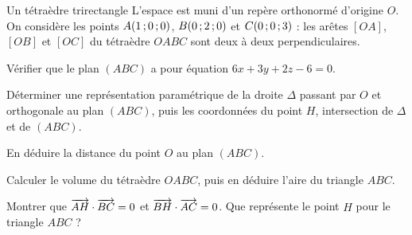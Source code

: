 \begin{exercice}[3]{Un tétraèdre trirectangle}
L'espace est muni d'un repère orthonormé d'origine $O$. On considère les points $A(1\,{;}\,0\,{;}\,0)$, $B(0\,{;}\,2\,{;}\,0)$ et $C(0\,{;}\,0\,{;}\,3)$ :
les arêtes $[OA]$, $[OB]$ et $[OC]$ du tétraèdre $OABC$ sont deux à deux perpendiculaires.
\begin{questions}
  \item Vérifier que le plan $(ABC)$ a pour équation $6x+3y+2z-6=0$.
  \item Déterminer une représentation paramétrique de la droite $\Delta$ passant par $O$ et orthogonale au plan $(ABC)$, puis les
    coordonnées du point $H$, intersection de $\Delta$ et de $(ABC)$.
  \item En déduire la distance du point $O$ au plan $(ABC)$.
  \item Calculer le volume du tétraèdre $OABC$, puis en déduire l'aire du triangle $ABC$.
  \item Montrer que $\overrightarrow{AH}\cdot\overrightarrow{BC}=0$ et $\overrightarrow{BH}\cdot\overrightarrow{AC}=0$. Que représente le point $H$ pour le triangle $ABC$ ?
\end{questions}
\end{exercice}
